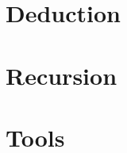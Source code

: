 \documentclass{beamer}
\begin{document}
\section{Deduction}

\section{Recursion}

\section{Tools}


%
%
\end{document}
